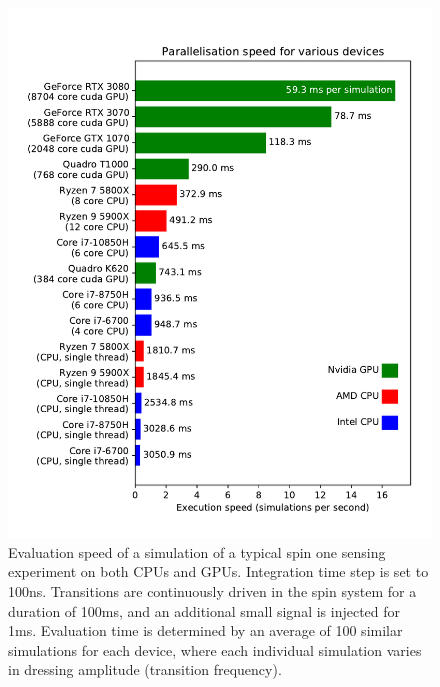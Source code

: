 \documentclass{jors}
\begin{document}
		\begin{figure}[htbp!]
			\centering
			\includegraphics[scale=0.7]{benchmark_device_aggregate.pdf}
			\caption{Evaluation speed of a simulation of a typical spin one sensing experiment on both CPUs and GPUs.
			Integration time step is set to 100ns.
			Transitions are continuously driven in the spin system for a duration of 100ms, and an additional small signal is injected for 1ms.
			Evaluation time is determined by an average of 100 similar simulations for each device, where each individual simulation varies in dressing amplitude (transition frequency).}
			\label{fig:benchmark_device_aggregate}
		\end{figure}
\end{document}
